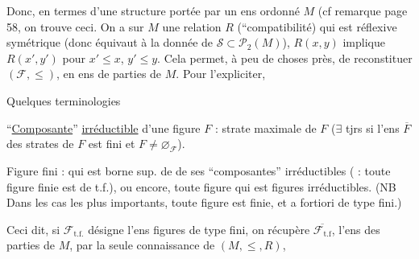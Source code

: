 Donc, en termes d'une structure portée par un ens ordonné $M$ (cf remarque page 58, on trouve ceci. On a sur  $M$ une relation $R$ (``compatibilité) qui est réflexive symétrique (donc équivaut à la donnée de $\mathcal S\subset\mathcal P_2(M)$),  $R(x,y)$ implique $R(x',y')$ pour $x'\leq x$, $y'\leq y$.  Cela permet, à peu de choses près, de reconstituer $(\mathcal F,\leq)$, en ens de parties de $M$. Pour l'expliciter,

Quelques terminologies

``\uline{Composante}'' \uline{irréductible}  d'une figure $F$ : strate maximale de $F$ ($\exists$ tjrs si l'ens $\overline F$ des strates de $F$ est fini  et $F\ne\varnothing_{\mathcal F}$).

Figure  fini : qui est borne sup. de  de ses ``composantes'' irréductibles ( : toute figure finie est de t.f.), ou encore, toute figure  qui est  figures irréductibles.  (NB Dans les cas les plus importants, toute figure est finie, et a fortiori de type fini.)

Ceci dit, si $\mathcal F_{\mathrm{t.f.}}$ désigne l'ens figures de type fini, on récupère $\overline{\mathcal F_{\mathrm{t.f}}}$, l'ens des parties  de $M$, par la seule connaissance de $(M,\leq,R)$,
